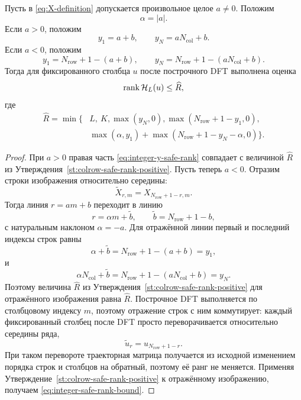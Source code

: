 \begin{statement}
\label{st:colrow-safe-rank-integer}
Пусть в \eqref{eq:X-definition} допускается произвольное целое $a\ne0$.
Положим
\[
    \alpha=|a|.
\]
Если $a>0$, положим
\[
    y_1=a+b,
    \qquad
    y_N=aN_{\mathrm{col}}+b.
\]
Если $a<0$, положим
\[
    y_1=N_{\mathrm{row}}+1-(a+b),
    \qquad
    y_N=N_{\mathrm{row}}+1-(aN_{\mathrm{col}}+b).
\]
Тогда для фиксированного столбца $u$ после построчного DFT выполнена оценка
\begin{equation}
    \operatorname{rank} \mathcal H_L(u)
    \le
    \widehat{R},
    \label{eq:integer-safe-rank-bound}
\end{equation}
где
\begin{equation}
    \begin{aligned}
    \widehat{R}
    =
    \min\{&
        L,\ K,
        \max(y_N,0),
        \max(N_{\mathrm{row}}+1-y_1,0),
        \\
        &
        \max(\alpha,y_1)
        +
        \max(N_{\mathrm{row}}+1-y_N-\alpha,0)
    \}.
    \end{aligned}
    \label{eq:integer-y-safe-rank}
\end{equation}
\end{statement}

\begin{proof}
При $a>0$ правая часть \eqref{eq:integer-y-safe-rank} совпадает с величиной
$\widehat{R}$ из Утверждения~\ref{st:colrow-safe-rank-positive}. Пусть теперь $a<0$.
Отразим строки изображения относительно середины:
\[
    \widetilde X_{r,m}=X_{N_{\mathrm{row}}+1-r,m}.
\]
Тогда линия $r=am+b$ переходит в линию
\[
    r=\alpha m+\widetilde b,
    \qquad
    \widetilde b=N_{\mathrm{row}}+1-b,
\]
с натуральным наклоном $\alpha=-a$. Для отражённой линии первый и последний
индексы строк равны
\[
    \alpha+\widetilde b
    =
    N_{\mathrm{row}}+1-(a+b)=y_1,
\]
и
\[
    \alpha N_{\mathrm{col}}+\widetilde b
    =
    N_{\mathrm{row}}+1-(aN_{\mathrm{col}}+b)=y_N.
\]
Поэтому величина $\widehat{R}$ из Утверждения~\ref{st:colrow-safe-rank-positive}
для отражённого изображения равна $\widehat{R}$.
Построчное DFT выполняется по столбцовому индексу $m$, поэтому отражение строк
с ним коммутирует: каждый фиксированный столбец после DFT просто переворачивается
относительно середины ряда,
\[
    \widetilde u_r=u_{N_{\mathrm{row}}+1-r}.
\]
При таком перевороте траекторная матрица получается из исходной изменением
порядка строк и столбцов на обратный, поэтому её ранг не меняется. Применяя
Утверждение~\ref{st:colrow-safe-rank-positive} к отражённому изображению, получаем
\eqref{eq:integer-safe-rank-bound}.
\end{proof}

